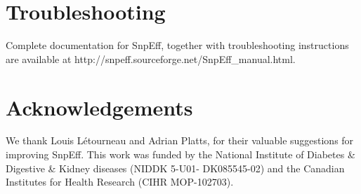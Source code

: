 \section{Troubleshooting}

Complete documentation for SnpEff, together with troubleshooting instructions are available at http://snpeff.sourceforge.net/SnpEff\_manual.html.

\section{Acknowledgements}

We thank Louis Létourneau and Adrian Platts, for their valuable suggestions for improving SnpEff. This work was funded by the National Institute of Diabetes \& Digestive \& Kidney diseases (NIDDK 5-U01- DK085545-02) and the Canadian Institutes for Health Research (CIHR MOP-102703).
